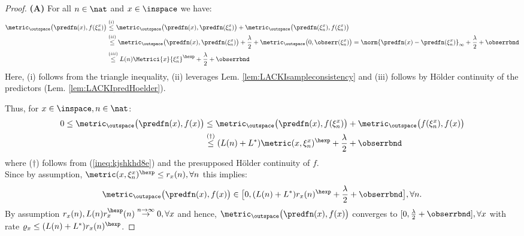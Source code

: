 \begin{thm}
\begin{proof}
\textbf{(A)} 
For all $n \in \nat$ and $x \in \inspace$ we have:
\begin{align} \metric_\outspace\bigl(\predfn(x) , f(\xi_n^x)  \bigr)
&\stackrel{(i)}{\leq} 
\metric_\outspace\bigl(\predfn(x) , \predfn(\xi_n^x)  \bigr) + \metric_\outspace\bigl(\predfn(\xi_n^x) , f(\xi_n^x)  \bigr)\\
&\stackrel{(ii)}{\leq} 
\metric_\outspace\bigl(\predfn(x) , \predfn(\xi_n^x)  \bigr) + \frac \lambda 2 + \metric_\outspace\bigl(0, \obserr(\xi_n^x) \bigr)
\stackrel{ }{=} 
\norm{\predfn(x) - \predfn(\xi_n^x) }_\infty + \frac \lambda 2 + \obserrbnd\\
&\stackrel{(iii) }{\leq} L(n)
\Metrici{x}{\xi_n^x }^\hexp + \frac \lambda 2 + \obserrbnd \label{ineq:kjshkhd8e}
\end{align}
Here, (i) follows from the triangle inequality, (ii) leverages Lem. \ref{lem:LACKIsampleconsistency} and (iii) follows by H\"older continuity of the predictors (Lem. \ref{lem:LACKIpredHoelder}).

%
Thus, for $x \in \inspace, n \in \nat$:
%
\begin{align}
0 \leq \metric_\outspace\bigl(\predfn(x) , f(x)\bigr) &\leq \metric_\outspace\bigl(\predfn(x) ,  f(\xi_n^x)  \bigr) + \metric_\outspace\bigl(f(\xi_n^x) , f(x)\bigr)\\
&\stackrel{(\dagger)}{\leq} (L(n)+ L^*) \metric(x,\xi_n^x )^\hexp +  \frac \lambda 2 +\obserrbnd
\end{align}
where ($\dagger$) follows from (\ref{ineq:kjshkhd8e}) and the presupposed H\"older continuity of $f$. \\

Since by assumption, $ \metric(x,\xi_n^x )^\hexp \leq r_x(n) 
, \forall n$ this implies:
\begin{equation}
\metric_\outspace\bigl(\predfn(x) , f(x)\bigr)  \in \bigl[0, (L(n)+ L^*) r_x(n)^\hexp +  \frac \lambda 2 +\obserrbnd \bigr], \forall n. \end{equation} 
By assumption $ r_x(n), L(n) r_x^\hexp(n) \stackrel{n \to \infty}{\to} 0, \forall x$ and hence, $\metric_\outspace\bigl(\predfn(x) , f(x)\bigr)$ converges to $  [0,\frac \lambda 2 +\obserrbnd], \forall x$ with rate $\varrho_x \leq(L(n)+ L^*) r_x(n)^\hexp $.
%
%
%


\end{proof}
\end{thm}
